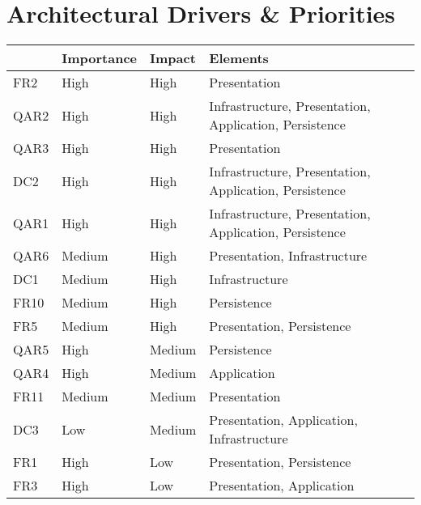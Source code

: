 \section{Architectural Drivers \& Priorities}
\begin{table}[h]
\centering
\begin{tabularx}{\linewidth}{lllX}
\hline
\rowcolor[HTML]{EFEFEF} 
\multicolumn{1}{|l|}{\cellcolor[HTML]{EFEFEF}Driver} & \multicolumn{1}{l|}{\cellcolor[HTML]{EFEFEF}Importance} & \multicolumn{1}{l|}{\cellcolor[HTML]{EFEFEF}Impact} & \multicolumn{1}{l|}{\cellcolor[HTML]{EFEFEF}Elements} \\ \hline
\rowcolor[HTML]{FFCCC9} 
FR2 & High & High & Presentation \\
\rowcolor[HTML]{FFCCC9} 
QAR2 & High & High & Infrastructure, Presentation, Application, Persistence \\
\rowcolor[HTML]{FFCCC9} 
QAR3 & High & High & Presentation \\
\rowcolor[HTML]{FFCCC9} 
DC2 & High & High & Infrastructure, Presentation, Application, Persistence \\
\rowcolor[HTML]{FFCCC9} 
QAR1 & High & High & Infrastructure, Presentation, Application, Persistence \\
\rowcolor[HTML]{FFCE93} 
QAR6 & Medium & High & Presentation, Infrastructure \\
\rowcolor[HTML]{FFCE93} 
DC1 & Medium & High & Infrastructure \\
\rowcolor[HTML]{FFCE93} 
FR10 & Medium & High & Persistence \\
\rowcolor[HTML]{FFCE93} 
FR5 & Medium & High & Presentation, Persistence \\
\rowcolor[HTML]{FFFC9E} 
QAR5 & High & Medium & Persistence \\
\rowcolor[HTML]{FFFC9E} 
QAR4 & High & Medium & Application \\
\rowcolor[HTML]{F9F9E4} 
FR11 & Medium & Medium & Presentation \\
\rowcolor[HTML]{F9F9E4} 
DC3 & Low & Medium & Presentation, Application, Infrastructure \\
\rowcolor[HTML]{CAF6C9} 
FR1 & High & Low & Presentation, Persistence \\
\rowcolor[HTML]{CAF6C9} 
FR3 & High & Low & Presentation, Application \\

\end{tabularx}
\end{table}
